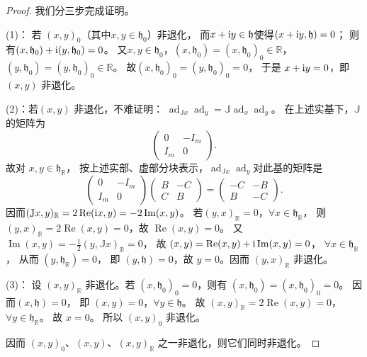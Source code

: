 \begin{proof}
我们分三步完成证明。

(1)： 若 $(x, y)_0$（其中$x,y\in\mathfrak{h}_0$）非退化，
而$x+\mathrm{i} y \in \mathfrak{h}$使得$(x+\mathrm{i} y, \mathfrak{h})=0$；
则有$(x, \mathfrak{h}_0)+\mathrm{i} (y, \mathfrak{h}_0)=0$。
又$x, y \in \mathfrak{h}_0$，$(x, \mathfrak{h}_0)= (x, \mathfrak{h}_0)_0 \in \mathbb{R}$，
$(y, \mathfrak{h}_0)=(y, \mathfrak{h}_0)_0 \in \mathbb{R}$。
故$(x, \mathfrak{h}_0)_0=(y, \mathfrak{h}_0)_0=0$，
于是 $x+\mathrm{i} y=0$，即 $(x, y)$ 非退化。

(2)：若$(x, y)$ 非退化，不难证明：
$\operatorname{ad}_{ \mathbb{J} x} \operatorname{ad}_y=\mathbb{J} \operatorname{ad}_x \operatorname{ad}_y$。
在上述实基下，$\mathbb J$ 的矩阵为
\[
    \begin{pmatrix}0&-I_m\\I_m&0\end{pmatrix}.
\]
故对 $x, y \in \mathfrak{h}_{\mathbb{R}}$，
按上述实部、虚部分块表示，$\operatorname{ad}_{ \mathbb{J} x} \operatorname{ad}_y$对此基的矩阵是
\begin{equation}
\left(\begin{array}{cc}
    0 & -I_m \\
    I_m & 0
\end{array}\right)\left(\begin{array}{cc}
    B & -C \\
    C & B
\end{array}\right)=\left(\begin{array}{cc}
    -C & -B \\
    B & -C
\end{array}\right) .
\end{equation}
因而$(\mathbb{J} x, y)_{\mathbb{R}}=2 \operatorname{Re}(\mathrm{i} x, y)=-2 \operatorname{Im}(x, y)$。
若$(y, x)_{\mathbb{R}}=0$，$\forall x \in \mathfrak{h}_{\mathbb{R}}$，
则 $(y, x)_{\mathbb{R}}=2 \operatorname{Re}(x, y)=0$，故 $\operatorname{Re}(x, y)=0$。
又$\operatorname{Im}(x, y)=-\frac{1}{2}(y, \mathbb{J} x)_{\mathbb{R}}=0$，
故 $(x, y)=\operatorname{Re}(x, y)+ \mathrm{i} \operatorname{Im}(x, y)=0$，
$\forall x \in \mathfrak{h}_{\mathbb{R}}$，
从而 $(y , \mathfrak{h}_{\mathbb{R}})=0$，
即 $(y, \mathfrak{h})=0$，故 $y=0$。因而 $(y, x)_{\mathbb{R}}$ 非退化。

(3)： 设 $(x, y)_{\mathbb{R}}$ 非退化。若 $(x, \mathfrak{h}_0)_0=0$，则有
$(x, \mathfrak{h}_0)=(x, \mathfrak{h}_0)_0=0 $。
因而$(x, \mathfrak{h})=0$， 即 $(x, y)=0$，$\forall y \in \mathfrak{h}$。
故 $(x, y)_{\mathbb{R}}=2 \operatorname{Re}(x, y)=0$，
$ \forall y \in \mathfrak{h}_{\mathbb{R}}$。
故 $x=0$。 所以 $(x, y)_0$ 非退化。

因而 $(x, y)_0$、$(x, y)$、$(x, y)_{\mathbb{R}}$ 之一非退化，则它们同时非退化。
\end{proof}

